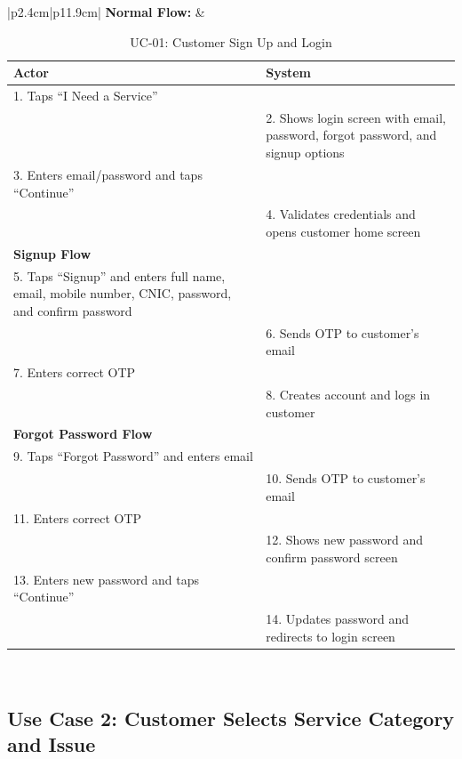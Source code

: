 \newpage

{\scriptsize
\vspace*{-0.8cm}
\renewcommand{\arraystretch}{0.92}
\begin{table}[H]
\centering
\begin{tabular}{|p{2.4cm}|p{11.9cm}|}
\hline
\textbf{Normal Flow:} &
\begin{tabular}[t]{|p{5.65cm}|p{5.65cm}|}
\hline
\textbf{Actor} & \textbf{System} \\ \hline
1. Taps ``I Need a Service'' & \\ \hline
 & 2. Shows login screen with email, password, forgot password, and signup options \\ \hline
3. Enters email/password and taps ``Continue'' & \\ \hline
 & 4. Validates credentials and opens customer home screen \\ \hline
\multicolumn{2}{|l|}{\textbf{Signup Flow}} \\ \hline
5. Taps ``Signup'' and enters full name, email, mobile number, CNIC, password, and confirm password & \\ \hline
 & 6. Sends OTP to customer's email \\ \hline
7. Enters correct OTP & \\ \hline
 & 8. Creates account and logs in customer \\ \hline
\multicolumn{2}{|l|}{\textbf{Forgot Password Flow}} \\ \hline
9. Taps ``Forgot Password'' and enters email & \\ \hline
 & 10. Sends OTP to customer's email \\ \hline
11. Enters correct OTP & \\ \hline
 & 12. Shows new password and confirm password screen \\ \hline
13. Enters new password and taps ``Continue'' & \\ \hline
 & 14. Updates password and redirects to login screen \\ \hline
\end{tabular} \\ \hline
\end{tabular}
\caption{UC-01: Customer Sign Up and Login}
\end{table}
}

\newpage

\subsection*{Use Case 2: Customer Selects Service Category and Issue}

